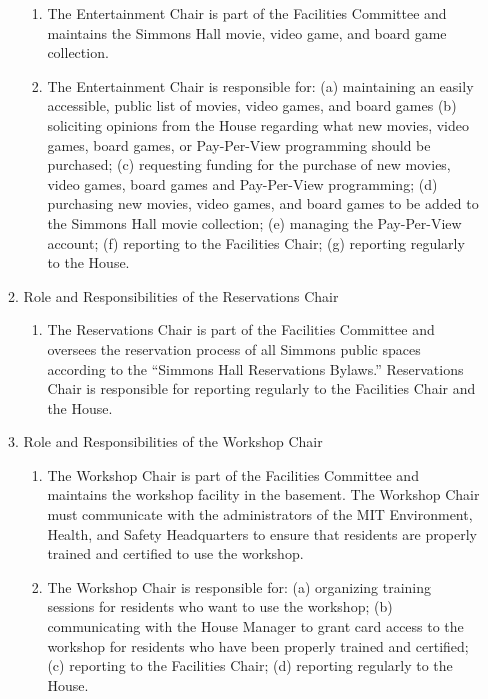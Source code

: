 \documentclass[letterpaper]{article}
\begin{document}
\begin{enumerate}
\begin{enumerate}
\begin{enumerate}

\item The Entertainment Chair is part of the Facilities Committee and maintains the Simmons Hall movie, video game, and board game collection.

\item The Entertainment Chair is responsible for: (a) maintaining an easily accessible, public list of movies, video games, and board games (b) soliciting opinions from the House regarding what new movies, video games, board games, or Pay-Per-View programming should be purchased; (c) requesting funding for the purchase of new movies, video games, board games and Pay-Per-View programming; (d) purchasing new movies, video games, and board games to be added to the Simmons Hall movie collection; (e) managing the Pay-Per-View account; (f) reporting to the Facilities Chair; (g) reporting regularly to the House.

\end{enumerate}

\item Role and Responsibilities of the Reservations Chair 

\begin{enumerate}

\item The Reservations Chair is part of the Facilities Committee and oversees the reservation process of all Simmons public spaces according to the ``Simmons Hall Reservations Bylaws.'' Reservations Chair is responsible for reporting regularly to the Facilities Chair and the House. 

\end{enumerate}

\item Role and Responsibilities of the Workshop Chair 

\begin{enumerate}

\item The Workshop Chair is part of the Facilities Committee and maintains the workshop facility in the basement. The Workshop Chair must communicate with the administrators of the MIT Environment, Health, and Safety Headquarters to ensure that residents are properly trained and certified to use the workshop.

\item The Workshop Chair is responsible for: (a) organizing training sessions for residents who want to use the workshop; (b) communicating with the House Manager to grant card access to the workshop for residents who have been properly trained and certified; (c) reporting to the Facilities Chair; (d) reporting regularly to the House.


\end{enumerate}
\end{enumerate}
\end{enumerate}
\end{document}

